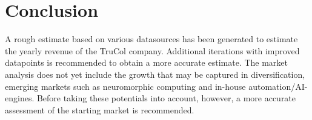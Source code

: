 \section{Conclusion}\label{sec:conclusion}
A rough estimate based on various datasources has been generated to estimate the yearly revenue of the TruCol company. Additional iterations with improved datapoints is recommended to obtain a more accurate estimate. The market analysis does not yet include the growth that may be captured in diversification, emerging markets such as neuromorphic computing and in-house automation/AI-engines. Before taking these potentials into account, however, a more accurate assessment of the starting market is recommended.
